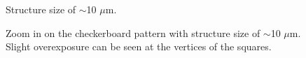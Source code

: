\begin{figure}[H]
	\centering
	\caption{Structure size of $\sim$10 $\mu$m.}
	\label{fig:b2d6_q6}
\end{figure}
\begin{figure}[H]
	\centering
	\caption{Zoom in on the checkerboard pattern with structure size of $\sim$10 $\mu$m. Slight overexposure can be seen at the vertices of the squares.}
	\label{fig:b2d7_q7}
\end{figure}
